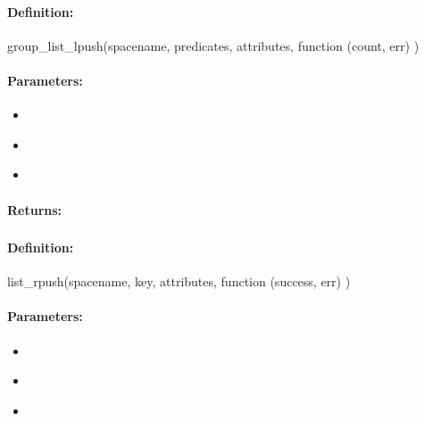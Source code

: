 \paragraph{Definition:}
\begin{javascriptcode}
group_list_lpush(spacename, predicates, attributes, function (count, err) {})
\end{javascriptcode}
\paragraph{Parameters:}
\begin{itemize}[noitemsep]
\item {}\\

\item {}\\

\item {}\\

\end{itemize}

\paragraph{Returns:}


\pagebreak
\subsubsection{}
\label{api:nodejs:list_rpush}


\paragraph{Definition:}
\begin{javascriptcode}
list_rpush(spacename, key, attributes, function (success, err) {})
\end{javascriptcode}
\paragraph{Parameters:}
\begin{itemize}[noitemsep]
\item {}\\

\item {}\\

\item {}\\

\end{itemize}

